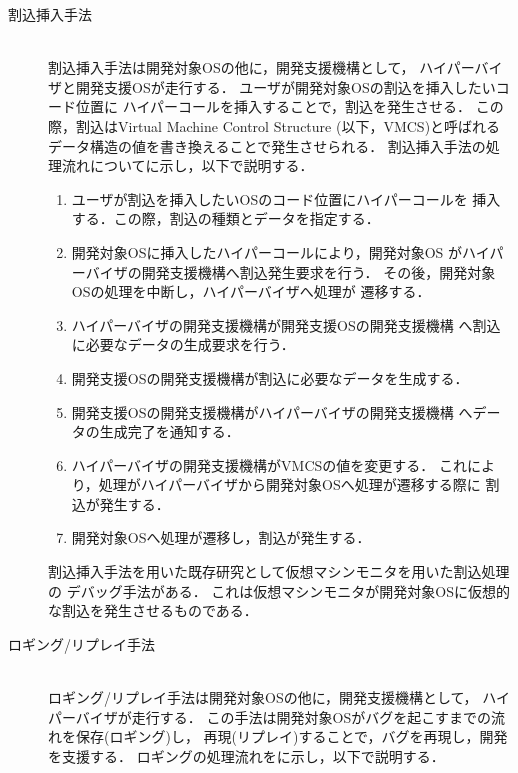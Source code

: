 \documentclass[submit,techreq,noauthor,dvipdfmx]{ipsj}
\begin{document}
\begin{description}
    \item[割込挿入手法]\mbox{}\\
        割込挿入手法は開発対象OSの他に，開発支援機構として，
        ハイパーバイザと開発支援OSが走行する．
        ユーザが開発対象OSの割込を挿入したいコード位置に
        ハイパーコールを挿入することで，割込を発生させる．
        この際，割込はVirtual Machine Control Structure (以下，VMCS)と呼ばれる
        データ構造の値を書き換えることで発生させられる．
        割込挿入手法の処理流れについてに示し，以下で説明する．
        \begin{enumerate}
            \item
                ユーザが割込を挿入したいOSのコード位置にハイパーコールを
                挿入する．この際，割込の種類とデータを指定する．
            \item 
                開発対象OSに挿入したハイパーコールにより，開発対象OS
                がハイパーバイザの開発支援機構へ割込発生要求を行う．
                その後，開発対象OSの処理を中断し，ハイパーバイザへ処理が
                遷移する．
            \item 
                ハイパーバイザの開発支援機構が開発支援OSの開発支援機構
                へ割込に必要なデータの生成要求を行う．
            \item 
                開発支援OSの開発支援機構が割込に必要なデータを生成する．
            \item 
                開発支援OSの開発支援機構がハイパーバイザの開発支援機構
                へデータの生成完了を通知する．
            \item 
                ハイパーバイザの開発支援機構がVMCSの値を変更する．
                これにより，処理がハイパーバイザから開発対象OSへ処理が遷移する際に
                割込が発生する．
            \item 
                開発対象OSへ処理が遷移し，割込が発生する．
        \end{enumerate}

        割込挿入手法を用いた既存研究として仮想マシンモニタを用いた割込処理の
        デバッグ手法\cite{miyahara}がある．
        これは仮想マシンモニタが開発対象OSに仮想的な割込を発生させるものである．

    \item[ロギング/リプレイ手法]\mbox{}\\
        ロギング/リプレイ手法は開発対象OSの他に，開発支援機構として，
        ハイパーバイザが走行する．
        この手法は開発対象OSがバグを起こすまでの流れを保存(ロギング)し，
        再現(リプレイ)することで，バグを再現し，開発を支援する．
        ロギングの処理流れをに示し，以下で説明する．


\end{description}
\end{document}
